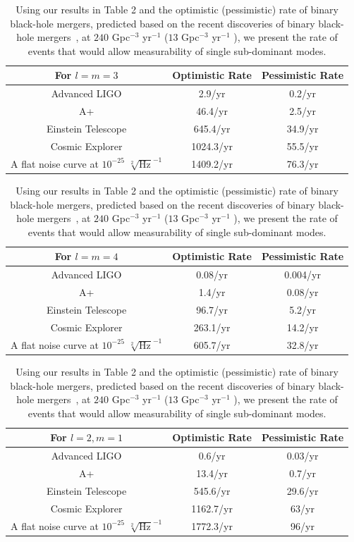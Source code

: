 


% 



\begin{table}
\centering
\subfloat 
\centering
\begin{tabular}{||c c c ||} 
 \hline
 For $l=m=3$& Optimistic Rate & Pessimistic Rate \\ [0.5ex] 
 \hline\hline
 Advanced LIGO & 2.9/yr & 0.2/yr \\ 
 A+ & 46.4/yr & 2.5/yr \\
 Einstein Telescope & 645.4/yr & 34.9/yr \\
 Cosmic Explorer & 1024.3/yr & 55.5/yr \\
 A flat noise curve at $10^{-25}$ $\sqrt[2]{\mathrm{Hz}}^{-1}$ & 1409.2/yr & 76.3/yr \\ [1ex] 
 \hline
\end{tabular}

\subfloat 
\centering
\begin{tabular}{||c c c ||} 
 \hline
 For $l=m=4$& Optimistic Rate & Pessimistic Rate \\ [0.5ex] 
 \hline\hline
 Advanced LIGO & 0.08/yr & 0.004/yr \\ 
 A+ & 1.4/yr & 0.08/yr \\
 Einstein Telescope & 96.7/yr & 5.2/yr \\
 Cosmic Explorer & 263.1/yr & 14.2/yr \\
 A flat noise curve at $10^{-25}$ $\sqrt[2]{\mathrm{Hz}}^{-1}$ & 605.7/yr & 32.8/yr \\ [1ex] 
 \hline
\end{tabular}

\centering
\begin{tabular}{||c c c ||} 
 \hline
For $l=2, m=1$ & Optimistic Rate & Pessimistic Rate \\ [0.5ex] 
 \hline\hline
 Advanced LIGO & 0.6/yr & 0.03/yr \\ 
A+ & 13.4/yr & 0.7/yr \\
 Einstein Telescope & 545.6/yr & 29.6/yr \\
 Cosmic Explorer & 1162.7/yr & 63/yr \\
 A flat noise curve at $10^{-25}$ $\sqrt[2]{\mathrm{Hz}}^{-1}$ & 1772.3/yr & 96/yr \\ [1ex] 
 \hline
\end{tabular}


\caption{Using our results in Table 2 and the optimistic (pessimistic) rate of binary black-hole mergers, predicted based on the recent discoveries of binary black-hole mergers~\cite{LIGO:2016Rates}, at $240$ Gpc$^{-3}$ yr$^{-1}$ ($13$ Gpc$^{-3}$ yr$^{-1}$ ), we present the rate of events that would allow measurability of single sub-dominant modes.}
\end{table}

